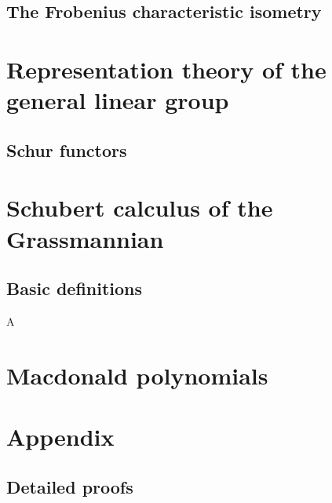 \documentclass{article}
\begin{document}
\subsection{The Frobenius characteristic isometry}

\section{Representation theory of the general linear group}

\subsection{Schur functors}

\section{Schubert calculus of the Grassmannian}

\subsection{Basic definitions}

\begin{definition}
    A 
\end{definition}

\section{Macdonald polynomials}

\section{Appendix}


\subsection{Detailed proofs}
\end{document}
